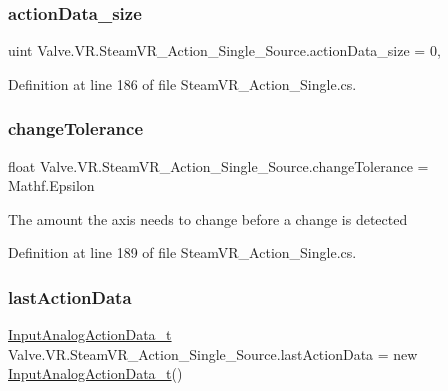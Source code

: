 \subsubsection{\texorpdfstring{actionData\_size}{actionData\_size}}
{\footnotesize\ttfamily uint Valve.\+V\+R.\+Steam\+V\+R\+\_\+\+Action\+\_\+\+Single\+\_\+\+Source.\+action\+Data\+\_\+size = 0\hspace{0.3cm}{\ttfamily [static]}, {\ttfamily [protected]}}



Definition at line 186 of file Steam\+V\+R\+\_\+\+Action\+\_\+\+Single.\+cs.

\mbox{\label{class_valve_1_1_v_r_1_1_steam_v_r___action___single___source_a88f8a8662eb86d853fef991ae77356d1}} 
\subsubsection{\texorpdfstring{changeTolerance}{changeTolerance}}
{\footnotesize\ttfamily float Valve.\+V\+R.\+Steam\+V\+R\+\_\+\+Action\+\_\+\+Single\+\_\+\+Source.\+change\+Tolerance = Mathf.\+Epsilon}



The amount the axis needs to change before a change is detected 



Definition at line 189 of file Steam\+V\+R\+\_\+\+Action\+\_\+\+Single.\+cs.

\mbox{\label{class_valve_1_1_v_r_1_1_steam_v_r___action___single___source_a638b9b62737ae9081072d9d0fdaf8ba3}} 
\subsubsection{\texorpdfstring{lastActionData}{lastActionData}}
{\footnotesize\ttfamily \mbox{\hyperlink{struct_valve_1_1_v_r_1_1_input_analog_action_data__t}{Input\+Analog\+Action\+Data\+\_\+t}} Valve.\+V\+R.\+Steam\+V\+R\+\_\+\+Action\+\_\+\+Single\+\_\+\+Source.\+last\+Action\+Data = new \mbox{\hyperlink{struct_valve_1_1_v_r_1_1_input_analog_action_data__t}{Input\+Analog\+Action\+Data\+\_\+t}}()\hspace{0.3cm}{\ttfamily [protected]}}



